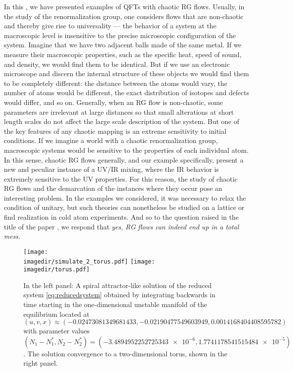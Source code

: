 In this \paper{}, we have presented examples of QFTs with chaotic RG flows. Usually, in the study of the renormalization group, one considers flows that are non-chaotic and thereby give rise to universality --- the behavior of a system at the macroscopic level is insensitive to the precise microscopic configuration of the system. Imagine that we have two adjacent balls made of the same metal. If we measure their macroscopic properties, such as the specific heat, speed of sound, and density, we would find them to be identical. But if we use an electronic microscope and discern the internal structure of these objects we would find them to be completely different: the distance between the atoms would vary, the number of atoms would be different, the exact distribution of isotopes and defects would differ, and so on. Generally, when an RG flow is non-chaotic, some parameters are irrelevant at large distances so that small alterations at short length scales do not affect the large scale description of the system. But one of the key features of any chaotic mapping is an extreme sensitivity to initial conditions. If we imagine a world with a chaotic renormalization group, macroscopic systems would be sensitive to the properties of each individual atom. In this sense, chaotic RG flows generally, and our example specifically, present a new and peculiar instance of a UV/IR mixing, where the IR behavior is extremely sensitive to the UV properties. For this reason, the study of chaotic RG flows and the demarcation of the instances where they occur pose an interesting problem. In the examples we considered, it was necessary to relax the condition of unitary, but such theories can nonetheless be studied on a lattice or find realization in cold atom experiments. And so to the question raised in the title of the paper \cite{morozov2003can}, we respond that {\it yes, RG flows can indeed end up in a total mess.} 

\begin{figure}
    \texttt{[image: \\imagedir/simulate\_2\_torus.pdf]}%
    \hfill
    \texttt{[image: \\imagedir/torus.pdf]}
\caption{In the left panel: A spiral attractor-like solution of the reduced system \cref{eq:reducedsystem} obtained by integrating backwards in time starting in the one-dimensional unstable manifold of the equilibrium located at $(u,v,x)\approx (\num{-0.02473081349681433},\num{-0.02190477549603949},\num{0.0014168404408595782})$ with parameter values $(N_1-N_1^*, N_2-N_2^*) = (\num{-3.4894952252725343e-6}, \num{1.7741178541515484e-5})$.
The solution convergence to a two-dimensional torus, shown in the right panel.
\label{fig:2intersol}}
\end{figure}


